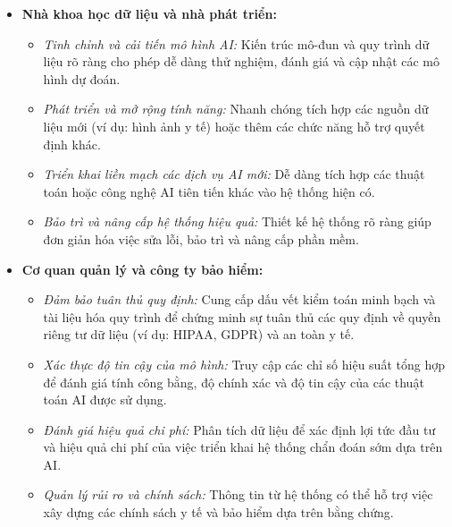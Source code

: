 \begin{itemize}
    \item \textbf{Nhà khoa học dữ liệu và nhà phát triển:}
    \begin{itemize}
        \item \textit{Tinh chỉnh và cải tiến mô hình AI:} Kiến trúc mô-đun và quy trình dữ liệu rõ ràng cho phép dễ dàng thử nghiệm, đánh giá và cập nhật các mô hình dự đoán.
        \item \textit{Phát triển và mở rộng tính năng:} Nhanh chóng tích hợp các nguồn dữ liệu mới (ví dụ: hình ảnh y tế) hoặc thêm các chức năng hỗ trợ quyết định khác.
        \item \textit{Triển khai liền mạch các dịch vụ AI mới:} Dễ dàng tích hợp các thuật toán hoặc công nghệ AI tiên tiến khác vào hệ thống hiện có.
        \item \textit{Bảo trì và nâng cấp hệ thống hiệu quả:} Thiết kế hệ thống rõ ràng giúp đơn giản hóa việc sửa lỗi, bảo trì và nâng cấp phần mềm.
    \end{itemize}

    \item \textbf{Cơ quan quản lý và công ty bảo hiểm:}
    \begin{itemize}
        \item \textit{Đảm bảo tuân thủ quy định:} Cung cấp dấu vết kiểm toán minh bạch và tài liệu hóa quy trình để chứng minh sự tuân thủ các quy định về quyền riêng tư dữ liệu (ví dụ: HIPAA, GDPR) và an toàn y tế.
        \item \textit{Xác thực độ tin cậy của mô hình:} Truy cập các chỉ số hiệu suất tổng hợp để đánh giá tính công bằng, độ chính xác và độ tin cậy của các thuật toán AI được sử dụng.
        \item \textit{Đánh giá hiệu quả chi phí:} Phân tích dữ liệu để xác định lợi tức đầu tư và hiệu quả chi phí của việc triển khai hệ thống chẩn đoán sớm dựa trên AI.
        \item \textit{Quản lý rủi ro và chính sách:} Thông tin từ hệ thống có thể hỗ trợ việc xây dựng các chính sách y tế và bảo hiểm dựa trên bằng chứng.
    \end{itemize}
\end{itemize}
